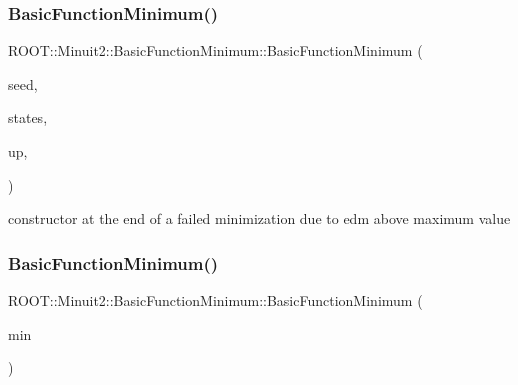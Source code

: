 \subsubsection{\texorpdfstring{BasicFunctionMinimum()}{BasicFunctionMinimum()}\hspace{0.1cm}{\footnotesize\ttfamily [9/10]}}
{\footnotesize\ttfamily R\+O\+O\+T\+::\+Minuit2\+::\+Basic\+Function\+Minimum\+::\+Basic\+Function\+Minimum (\begin{DoxyParamCaption}\item[{const \mbox{\hyperlink{classROOT_1_1Minuit2_1_1MinimumSeed}{Minimum\+Seed}} \&}]{seed,  }\item[{const std\+::vector$<$ \mbox{\hyperlink{classROOT_1_1Minuit2_1_1MinimumState}{Minimum\+State}} $>$ \&}]{states,  }\item[{double}]{up,  }\item[{\mbox{\hyperlink{classROOT_1_1Minuit2_1_1BasicFunctionMinimum_1_1MnAboveMaxEdm}{Mn\+Above\+Max\+Edm}}}]{ }\end{DoxyParamCaption})\hspace{0.3cm}{\ttfamily [inline]}}



constructor at the end of a failed minimization due to edm above maximum value 

\mbox{\label{classROOT_1_1Minuit2_1_1BasicFunctionMinimum_ae0812dcb933989ffd9e096792367d0b7}} 
\subsubsection{\texorpdfstring{BasicFunctionMinimum()}{BasicFunctionMinimum()}\hspace{0.1cm}{\footnotesize\ttfamily [10/10]}}
{\footnotesize\ttfamily R\+O\+O\+T\+::\+Minuit2\+::\+Basic\+Function\+Minimum\+::\+Basic\+Function\+Minimum (\begin{DoxyParamCaption}\item[{const \mbox{\hyperlink{classROOT_1_1Minuit2_1_1BasicFunctionMinimum}{Basic\+Function\+Minimum}} \&}]{min }\end{DoxyParamCaption})\hspace{0.3cm}{\ttfamily [inline]}}



